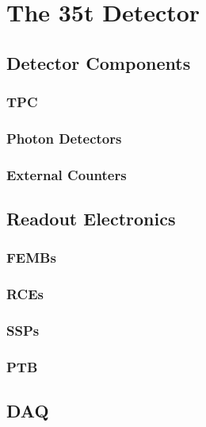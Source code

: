 \section{The 35t Detector}\label{sec:35tDetector}

\subsection{Detector Components}\label{sec:35tDetectorComponents}

\subsubsection{TPC}\label{35tTPC}

\subsubsection{Photon Detectors}\label{35tPhoton}

\subsubsection{External Counters}\label{35tCounters}

\subsection{Readout Electronics}\label{sec:35tReadoutElectronics}

\subsubsection{FEMBs}\label{35tFEMB}

\subsubsection{RCEs}\label{35tRCE}

\subsubsection{SSPs}\label{35tSSP}

\subsubsection{PTB}\label{35tPTB}

\subsection{DAQ}\label{35tDAQ}

